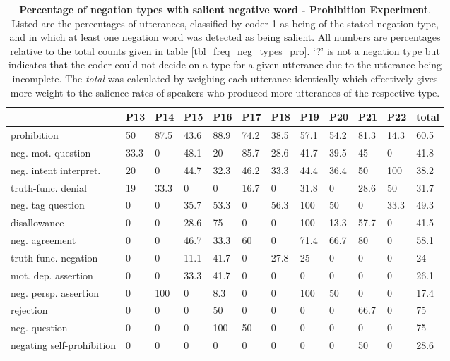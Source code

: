 \begin{screenonly}
\begin{table*}[h]
  \caption{\textbf{Percentage of negation types with salient negative word - Prohibition Experiment}. Listed are the
    percentages of utterances, classified by coder 1 as being of the stated negation type, and in which at least one negation word was detected
    as being salient. All numbers are percentages relative to the total counts given in table \ref{tbl_freq_neg_types_pro}.
    `?' is not a negation type but indicates that the coder could not decide on a type for a given utterance due to the
    utterance being incomplete. The \emph{total} was calculated by weighing each utterance identically which effectively
    gives more weight to the salience rates of speakers who produced more utterances of the respective type.}
  \label{tbl_freq_sal_neg_types_pro}
  \begin{tabular*}{\hsize}{@{\extracolsep{\fill}}llllllllllll}
    \toprule
    & P13 & P14 & P15 & P16 & P17 & P18 & P19 & P20 & P21 & P22 & total\\
    \midrule
    prohibition & 50 & 87.5 & 43.6 & 88.9 & 74.2 & 38.5 & 57.1 & 54.2 & 81.3 & 14.3 & 60.5\\
    neg. mot. question & 33.3 & 0 & 48.1 & 20 & 85.7 & 28.6 & 41.7 & 39.5 & 45 & 0 & 41.8\\
    neg. intent interpret. & 20 & 0 & 44.7 & 32.3 & 46.2 & 33.3 & 44.4 & 36.4 & 50 & 100 & 38.2\\
    truth-func. denial & 19 & 33.3 & 0 & 0 & 16.7 & 0 & 31.8 & 0 & 28.6 & 50 & 31.7\\
    neg. tag question & 0 & 0 & 35.7 & 53.3 & 0 & 56.3 & 100 & 50 & 0 & 33.3 & 49.3\\
    disallowance & 0 & 0 & 28.6 & 75 & 0 & 0 & 100 & 13.3 & 57.7 & 0 & 41.5\\
    neg. agreement & 0 & 0 & 46.7 & 33.3 & 60 & 0 & 71.4 & 66.7 & 80 & 0 & 58.1\\
    truth-func. negation & 0 & 0 & 11.1 & 41.7 & 0 & 27.8 & 25 & 0 & 0 & 0 & 24\\
    mot. dep. assertion & 0 & 0 & 33.3 & 41.7 & 0 & 0 & 0 & 0 & 0 & 0 & 26.1\\
    neg. persp. assertion & 0 & 100 & 0 & 8.3 & 0 & 0 & 100 & 50 & 0 & 0 & 17.4\\
    rejection & 0 & 0 & 0 & 50 & 0 & 0 & 0 & 0 & 66.7 & 0 & 75\\
    neg. question & 0 & 0 & 0 & 100 & 50 & 0 & 0 & 0 & 0 & 0 & 75\\
    negating self-prohibition & 0 & 0 & 0 & 0 & 0 & 0 & 0 & 0 & 50 & 0 & 28.6\\

\end{tabular*}
\end{table*}
\end{screenonly}
